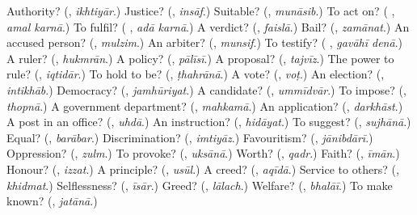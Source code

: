 \begin{tcolorbox}[breakable,colback=teal!4,colframe=teal!35!black,title={Before you move on}]
Authority? (\textbf{}, \emph{ikhtiyār}.) Justice? (\textbf{}, \emph{insāf}.) Suitable? (\textbf{}, \emph{munāsib}.) To act on? (\textbf{ }, \emph{amal karnā}.) To fulfil? (\textbf{ }, \emph{adā karnā}.) A verdict? (\textbf{}, \emph{faislā}.) Bail? (\textbf{}, \emph{zamānat}.) An accused person? (\textbf{}, \emph{mulzim}.) An arbiter? (\textbf{}, \emph{munsif}.) To testify? (\textbf{ }, \emph{gavāhī denā}.) A ruler? (\textbf{}, \emph{hukmrān}.) A policy? (\textbf{}, \emph{pālīsī}.) A proposal? (\textbf{}, \emph{tajvīz}.) The power to rule? (\textbf{}, \emph{iqtidār}.) To hold to be? (\textbf{}, \emph{ṭhahrānā}.) A vote? (\textbf{}, \emph{voṭ}.) An election? (\textbf{}, \emph{intikhāb}.) Democracy? (\textbf{}, \emph{jamhūriyat}.) A candidate? (\textbf{}, \emph{ummīdvār}.) To impose? (\textbf{}, \emph{thopnā}.) A government department? (\textbf{}, \emph{mahkamā}.) An application? (\textbf{}, \emph{darkhāst}.) A post in an office? (\textbf{}, \emph{uhdā}.) An instruction? (\textbf{}, \emph{hidāyat}.) To suggest? (\textbf{}, \emph{sujhānā}.) Equal? (\textbf{}, \emph{barābar}.) Discrimination? (\textbf{}, \emph{imtiyāz}.) Favouritism? (\textbf{}, \emph{jānibdārī}.) Oppression? (\textbf{}, \emph{zulm}.) To provoke? (\textbf{}, \emph{uksānā}.) Worth? (\textbf{}, \emph{qadr}.) Faith? (\textbf{}, \emph{īmān}.) Honour? (\textbf{}, \emph{izzat}.) A principle? (\textbf{}, \emph{usūl}.) A creed? (\textbf{}, \emph{aqīdā}.) Service to others? (\textbf{}, \emph{khidmat}.) Selflessness? (\textbf{}, \emph{īsār}.) Greed? (\textbf{}, \emph{lālach}.) Welfare? (\textbf{}, \emph{bhalāī}.) To make known? (\textbf{}, \emph{jatānā}.)
\end{tcolorbox}
